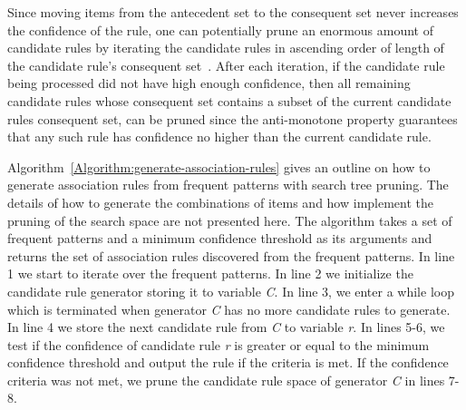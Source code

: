 Since moving items from the antecedent set to the consequent set never increases the confidence of the rule, one can potentially prune an enormous amount of candidate rules by iterating the candidate rules in ascending order of length of the candidate rule's consequent set~\cite{Agrawal:1994:FAM:645920.672836}. After each iteration, if the candidate rule being processed did not have high enough confidence, then all remaining candidate rules whose consequent set contains a subset of the current candidate rules consequent set, can be pruned since the anti-monotone property guarantees that any such rule has confidence no higher than the current candidate rule. 

Algorithm~\ref{Algorithm:generate-association-rules} gives an outline on how to generate association rules from frequent patterns with search tree pruning. The details of how to generate the combinations of items and how implement the pruning of the search space are not presented here. The algorithm takes a set of frequent patterns and a minimum confidence threshold as its arguments and returns the set of association rules discovered from the frequent patterns. In line 1 we start to iterate over the frequent patterns. In line 2 we initialize the candidate rule generator storing it to variable \textit{C}. In line 3, we enter a while loop which is terminated when generator \textit{C} has no more candidate rules to generate. In line 4 we store the next candidate rule from \textit{C} to variable \textit{r}. In lines 5-6, we test if the confidence of candidate rule \textit{r} is greater or equal to the minimum confidence threshold and output the rule if the criteria is met. If the confidence criteria was not met, we prune the candidate rule space of generator \textit{C} in lines 7-8.        